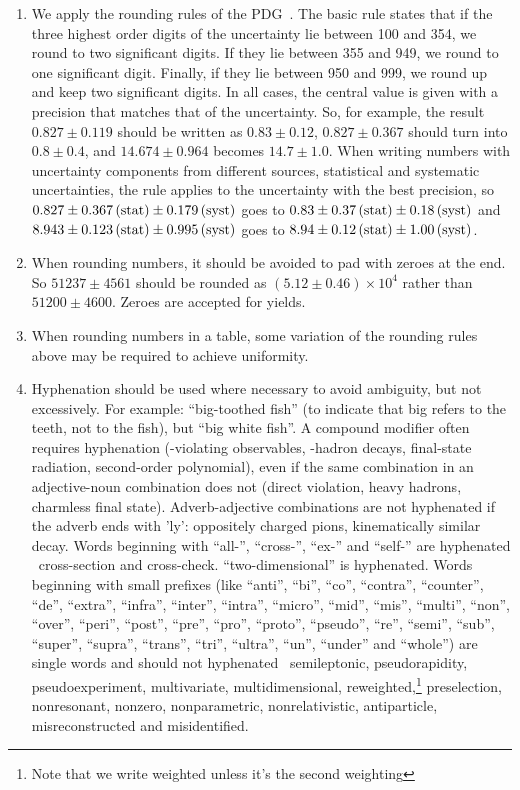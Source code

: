 \begin{enumerate}
\item We apply the rounding rules of the
  PDG~\cite{PDG2018}. The basic rule states that if the three
  highest order digits of the uncertainty lie between 100 and 354, we round
  to two significant digits. If they lie between 355 and 949, we round
  to one significant digit. Finally, if they lie between 950 and 999,
  we round up and keep two significant digits. In all cases,
  the central value is given with a precision that matches that of the
  uncertainty. So, for example, the result $0.827 \pm 0.119$ should be
  written as $0.83\pm 0.12$, $0.827\pm 0.367$ should turn into
  $0.8\pm 0.4$, and $14.674\pm0.964$ becomes $14.7\pm1.0$.
  When writing numbers with uncertainty components from
  different sources, \ie statistical and systematic uncertainties, the rule
  applies to the uncertainty with the best precision, so $0.827\pm
  0.367\text{\,(stat)}\pm 0.179\text{\,(syst)}$ goes to $0.83\pm 0.37\text{\,(stat)}\pm 0.18\text{\,(syst)}$ and
  $8.943\pm 0.123\text{\,(stat)}\pm 0.995\text{\,(syst)}$ goes to $8.94\pm 0.12\text{\,(stat)}\pm
  1.00\text{\,(syst)}$.

\item When rounding numbers, it should be avoided to pad with zeroes
  at the end. So $51237 \pm 4561$ should be rounded as $(5.12 \pm 0.46)
  \times 10^4$ rather than $51200 \pm 4600$. Zeroes are accepted for yields.

\item When rounding numbers in a table, some variation of the rounding
  rules above may be required to achieve uniformity.

\item Hyphenation should be used where necessary to avoid ambiguity,
  but not excessively. For example: ``big-toothed fish'' (to indicate
  that big refers to the teeth, not to the fish), but ``big white
  fish''.  A compound modifier often requires hyphenation
  (\CP-violating observables, \bquark-hadron decays, final-state
  radiation, second-order polynomial), even if the same combination in
  an adjective-noun combination does not (direct \CP violation, heavy
  \bquark hadrons, charmless final state).  Adverb-adjective
  combinations are not hyphenated if the adverb ends with 'ly':
  oppositely charged pions, kinematically similar decay.  Words
  beginning with ``all-'', ``cross-'', ``ex-'' and ``self-'' are
  hyphenated \eg\ cross-section and cross-check. ``two-dimensional''
  is hyphenated. Words beginning with small prefixes (like ``anti'',
  ``bi'', ``co'', ``contra'', ``counter'', ``de'', ``extra'', ``infra'',
  ``inter'', ``intra'', ``micro'', ``mid'', ``mis'', ``multi'', ``non'', ``over'',
  ``peri'', ``post'', ``pre'', ``pro'', ``proto'', ``pseudo'', ``re'', ``semi'',
  ``sub'', ``super'', ``supra'', ``trans'', ``tri'', ``ultra'', ``un'', ``under'' and
  ``whole'') are single words and should not hyphenated
  \eg\ semileptonic, pseudorapidity, pseudoexperiment, multivariate,
  multidimensional, reweighted,\footnote{Note that we write weighted unless it's the second weighting} preselection, nonresonant, nonzero,
  nonparametric, nonrelativistic, antiparticle,
  misreconstructed and misidentified.


\end{enumerate}
